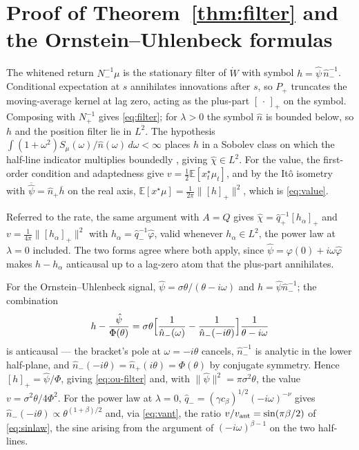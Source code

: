 \documentclass[11pt]{article}
\newcommand{\E}{\mathbb{E}}
\newcommand{\pluspart}[1]{\left[#1\right]_+}
\theoremstyle{plain}
\theoremstyle{definition}
\theoremstyle{remark}
\begin{document}
\section{Proof of Theorem~\ref{thm:filter} and the Ornstein--Uhlenbeck formulas}\label{app:B}
The whitened return $N_-^{-1}\mu$ is the stationary filter of $\dot W$ with symbol $h=\hat\psi\,\hat n_-^{-1}$. Conditional expectation at $s$ annihilates innovations after $s$, so $P_+$ truncates the moving-average kernel at lag zero, acting as the plus-part $\pluspart{\,\cdot\,}$ on the symbol. Composing with $N_+^{-1}$ gives \eqref{eq:filter}; for $\lambda>0$ the symbol $\hat n$ is bounded below, so $h$ and the position filter lie in $L^2$. The hypothesis $\int(1+\omega^2)S_\mu(\omega)/\hat n(\omega)\,d\omega<\infty$ places $h$ in a Sobolev class on which the half-line indicator multiplies boundedly \citep[Ch.~1]{LionsMagenes1972}, giving $\hat\chi\in L^2$. For the value, the first-order condition and adaptedness give $v=\tfrac12\E[x^\star_t\mu_t]$, and by the It\^o isometry with $\overline{\hat\psi}=\hat n_+\overline h$ on the real axis, $\E[x^\star\mu]=\tfrac1{2\pi}\|\pluspart{h}\|^2$, which is \eqref{eq:value}.

Referred to the rate, the same argument with $A=Q$ gives $\hat\chi=\hat q_+^{-1}\pluspart{h_\alpha}$ and $v=\frac1{4\pi}\|\pluspart{h_\alpha}\|^2$ with $h_\alpha=\hat q_-^{-1}\hat\varphi$, valid whenever $h_\alpha\in L^2$, the power law at $\lambda=0$ included. The two forms agree where both apply, since $\hat\psi=\varphi(0)+i\omega\hat\varphi$ makes $h-h_\alpha$ anticausal up to a lag-zero atom that the plus-part annihilates.

For the Ornstein--Uhlenbeck signal, $\hat\psi=\sigma\theta/(\theta-i\omega)$ and $h=\hat\psi\hat n_-^{-1}$; the combination
\[
h - \frac{\hat\psi}{\Phi(\theta)} = \sigma\theta\Bigl[\frac{1}{\hat n_-(\omega)} - \frac{1}{\hat n_-(-i\theta)}\Bigr]\frac{1}{\theta-i\omega}
\]
is anticausal --- the bracket's pole at $\omega=-i\theta$ cancels, $\hat n_-^{-1}$ is analytic in the lower half-plane, and $\hat n_-(-i\theta)=\hat n_+(i\theta)=\Phi(\theta)$ by conjugate symmetry. Hence $\pluspart{h}=\hat\psi/\Phi$, giving \eqref{eq:ou-filter} and, with $\|\hat\psi\|^2=\pi\sigma^2\theta$, the value $v=\sigma^2\theta/4\Phi^2$. For the power law at $\lambda=0$, $\hat q_-=(\gamma c_\beta)^{1/2}(-i\omega)^{-\nu}$ gives $\hat n_-(-i\theta)\propto\theta^{(1+\beta)/2}$ and, via \eqref{eq:vant}, the ratio $v/v_{\rm ant}=\sin(\pi\beta/2)$ of \eqref{eq:sinlaw}, the sine arising from the argument of $(-i\omega)^{\beta-1}$ on the two half-lines.
\end{document}
